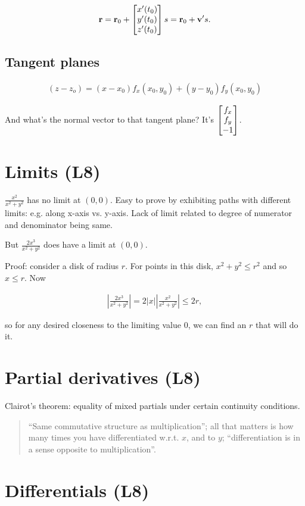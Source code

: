 \documentclass[12pt]{article}
\begin{document}
\begin{align*}
  \mathbf{r} = \mathbf{r}_0 + \begin{bmatrix}x'(t_0)\\y'(t_0)\\z'(t_0)\end{bmatrix}s = \mathbf{r}_0 + \mathbf{v}' s.
\end{align*}

\subsection*{Tangent planes}

\begin{align*}
  (z - z_o) = (x - x_0)f_x(x_0, y_0) + (y - y_0)f_y(x_0, y_0)
\end{align*}

And what's the normal vector to that tangent plane? It's $\begin{bmatrix}f_x\\f_y\\-1\end{bmatrix}$.


\section*{Limits (L8)}

$\frac{x^2}{x^2 + y^2}$ has no limit at $(0, 0)$.
Easy to prove by exhibiting paths with different limits: e.g. along x-axis vs. y-axis.
Lack of limit related to degree of numerator and denominator being same.

But $\frac{2x^3}{x^2 + y^2}$ does have a limit at $(0, 0)$.

Proof: consider a disk of radius $r$. For points in this disk, $x^2 + y^2 \leq r^2$ and so $x \leq r$.
Now

\begin{align*}
  \left|\frac{2x^3}{x^2 + y^2}\right| = 2|x|\left|\frac{x^2}{x^2 + y^2}\right| \leq 2r,
\end{align*}

so for any desired closeness to the limiting value 0, we can find an $r$ that will do it.

\section*{Partial derivatives (L8)}

Clairot's theorem: equality of mixed partials under certain continuity
conditions.

\begin{quote}
``Same commutative structure as multiplication''; all that matters
is how many times you have differentiated w.r.t. $x$, and to $y$;
``differentiation is in a sense opposite to multiplication''.
\end{quote}

\section*{Differentials (L8)}
\end{document}
